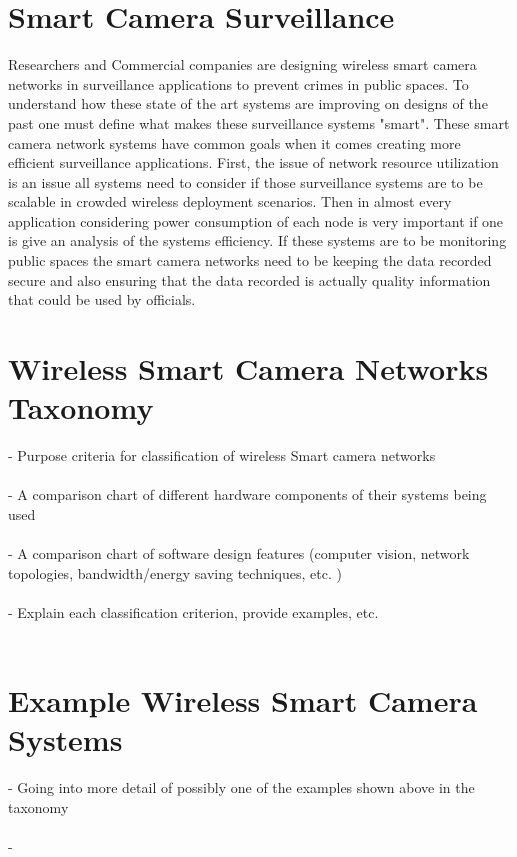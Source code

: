 \documentclass[journal,transmag]{IEEEtran}
\begin{document}
\section{Smart Camera Surveillance}
Researchers and Commercial companies are designing wireless smart camera networks in surveillance applications to prevent crimes in public spaces. To
understand how these state of the art systems are improving on designs of the past one must define what makes these surveillance systems "smart". These
smart camera network systems have common goals when it comes creating more efficient surveillance applications. First, the issue of network resource
utilization is an issue all systems need to consider if those surveillance systems are to be scalable in crowded wireless deployment scenarios. Then in
almost every application considering power consumption of each node is very important if one is give an analysis of the systems efficiency. If these
systems are to be monitoring public spaces the smart camera networks need to be keeping the data recorded secure and also ensuring that the data recorded
is actually quality information that could be used by officials. \\

\section{Wireless Smart Camera Networks Taxonomy}
\-- Purpose criteria for classification of wireless Smart camera networks \\ \\
\-- A comparison chart of different hardware components of their systems 
	being used\\ \\
\-- A comparison chart of software design features (computer vision, network
	topologies, bandwidth/energy saving techniques, etc. )\\ \\
\-- Explain each classification criterion, provide examples, etc.\\ \\

\section{Example Wireless Smart Camera Systems}
\-- Going into more detail of possibly one of the examples shown above in
	the taxonomy\\ \\
\--
\end{document}
